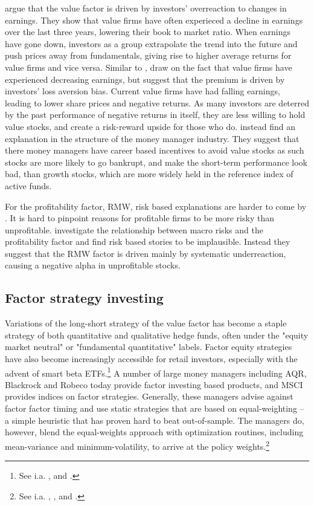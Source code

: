 \textcite{LakonishokShleiferVishny1994} argue that the value factor is driven by investors' overreaction to changes in earnings. They show that value firms have often experieced a decline in earnings over the last three years, lowering their book to market ratio. When earnings have gone down, investors as a group extrapolate the trend into the future and push prices away from fundamentals, giving rise to higher average returns for value firms and vice versa. Similar to \textcite{LakonishokShleiferVishny1994}, \textcite{BarberisHuang2001} draw on the fact that value firms have experienced decreasing earnings, but suggest that the premium is driven by investors' loss aversion bias. Current value firms have had falling earnings, leading to lower share prices and negative returns. As many investors are deterred by the past performance of negative returns in itself, they are less willing to hold value stocks, and create a risk-reward upside for those who do. \textcite{LakonishokShleiferVishny1992} instead find an explanation in the structure of the money manager industry. They suggest that there money managers have career based incentives to avoid value stocks as such stocks are more likely to go bankrupt, and make the short-term performance look bad, than growth stocks, which are more widely held in the reference index of active funds.

For the profitability factor, RMW, risk based explanations are harder to come by \autocite{NovyMarx2013}. It is hard to pinpoint reasons for profitable firms to be more risky than unprofitable. \textcite{Wang2013} investigate the relationship between macro risks and the profitability factor and find risk based stories to be implausible. Instead they suggest that the RMW factor is driven mainly by systematic underreaction, causing a negative alpha in unprofitable stocks.

\subsection{Factor strategy investing}
Variations of the long-short strategy of the value factor has become a staple strategy of both quantitative and qualitative hedge funds, often under the "equity market neutral" or "fundamental quantitative" labels. Factor equity strategies have also become increasingly accessible for retail investors, especially with the advent of smart beta ETFs.\footnote{See i.a. \textcite{Pedersen2015}, \textcite{AQREMN} and \textcite{McKEMN}.} A number of large money managers including AQR, Blackrock and Robeco today provide factor investing based products, and MSCI provides indices on factor strategies. Generally, these managers advise against factor factor timing and use static strategies that are based on equal-weighting -- a simple heuristic that has proven hard to beat out-of-sample. The managers do, however, blend the equal-weights approach with optimization routines, including mean-variance and minimum-volatility, to arrive at the policy weights.\footnote{See i.a. \textcite{AQRSiren}, \textcite{BlackRock}, \textcite{MSCI} and \textcite{Robeco}.}

